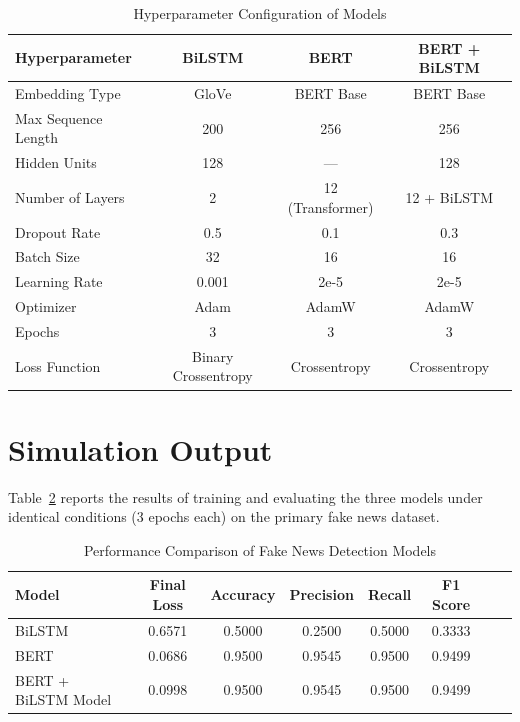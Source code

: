 \begin{table}[H]
\centering
\caption{Hyperparameter Configuration of Models}
\label{tab:hyperparameters}
\small
\begin{tabular}{|l|c|c|c|}
\hline
\textbf{Hyperparameter} & \textbf{BiLSTM} & \textbf{BERT} & \textbf{BERT + BiLSTM} \\ \hline
Embedding Type & GloVe & BERT Base & BERT Base \\ \hline
Max Sequence Length & 200 & 256 & 256 \\ \hline
Hidden Units & 128 & --- & 128 \\ \hline
Number of Layers & 2 & 12 (Transformer) & 12 + BiLSTM \\ \hline
Dropout Rate & 0.5 & 0.1 & 0.3 \\ \hline
Batch Size & 32 & 16 & 16 \\ \hline
Learning Rate & 0.001 & 2e-5 & 2e-5 \\ \hline
Optimizer & Adam & AdamW & AdamW \\ \hline
Epochs & 3 & 3 & 3 \\ \hline
Loss Function & Binary Crossentropy & Crossentropy & Crossentropy \\ \hline
\end{tabular}
\end{table}

\section{Simulation Output}

Table~\ref{tab:comparison} reports the results of training and evaluating the three models under identical conditions (3 epochs each) on the primary fake news dataset.

\begin{table}[h]
\centering
\caption{Performance Comparison of Fake News Detection Models}
\label{tab:comparison}
\small
\begin{tabular}{p{}ccccccp{}}
\hline
 \textbf{Model} & \textbf{Final Loss} & \textbf{Accuracy} & \textbf{Precision} & \textbf{Recall} & \textbf{F1 Score} \\ \hline
 BiLSTM & 0.6571 & 0.5000 & 0.2500 & 0.5000 & 0.3333 \\
 BERT & 0.0686 & 0.9500 & 0.9545 & 0.9500 & 0.9499  \\
 BERT + BiLSTM Model & 0.0998 & 0.9500 & 0.9545 & 0.9500 & 0.9499 \\ \hline
\end{tabular}
\end{table}

